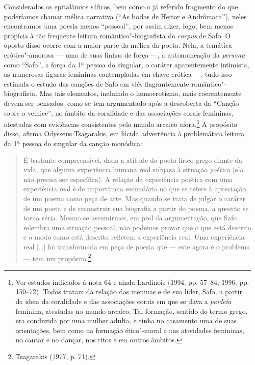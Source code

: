 Considerados os epitalâmios sáficos, bem como o já referido fragmento do que
poderíamos chamar mélica narrativa (“As bodas de Heitor e Andrômaca”), neles
encontramos uma poesia menos “pessoal”, por assim dizer, logo, bem menos
propícia à tão frequente leitura romântico"-biografista do \textit{corpus} de
Safo. O oposto disso ocorre com a maior parte da mélica da poeta. Nela, a temática
erótico"-amorosa --- uma de suas linhas de força ---, a autonomeação da
\textit{persona} como “Safo”, a força da 1ª pessoa do singular, o caráter
aparentemente intimista, as numerosas figuras
femininas contempladas em chave erótica ---, tudo isso estimula o estudo das
canções de Safo em viés flagrantemente romântico"-biografista. Mas tais elementos, incluindo o homoerotismo, mais coerentemente devem ser pensados, como se tem argumentado após a descoberta da ``Canção sobre a velhice'', no âmbito da coralidade e das associações corais femininas, atestadas com evidências consistentes pelo mundo arcaico afora.\footnote{Ver estudos indicados à nota 64 e ainda Lardinois (1994, pp. 57--84; 1996, pp. 150--72). Todos tratam da relação das meninas e de sua líder, Safo, a partir da ideia da coralidade e das associações corais em que se dava a \textit{paideía} feminina, atestadas no mundo arcaico. Tal formação, sentido do termo grego, era conduzida por uma mulher adulta, e tinha no casamento uma de suas orientações, bem como na formação ético"-moral e nas atividades femininas, no cantar e no dançar, nos ritos e em outros âmbitos.} A propósito
disso, afirma Odysseus Tsagarakis, em lúcida advertência à
problemática leitura da 1ª pessoa do singular da canção
monódica:

\begin{quote}
É bastante compreensível, dada a atitude do poeta lírico grego diante da vida,
que alguma experiência humana real subjaza à situação \textit{poética} (ela não
precisa ser específica). A relação da experiência poética com uma experiência
real é de importância secundária no que se refere à apreciação de um poema como
peça de arte. Mas quando se trata de julgar o caráter de um poeta e de
reconstruir sua biografia a partir do poema, a questão se torna séria. Mesmo se
assumirmos, em prol da argumentação, que Safo relembra uma situação pessoal,
não podemos provar que o que está descrito e o modo como está descrito refletem
a experiência real. Uma experiência real [\ldots{}] foi transformada em peça de
poesia que --- este agora é o problema --- tem um propósito.\footnote{ Tsagarakis (1977, p. 71).}
\end{quote}


